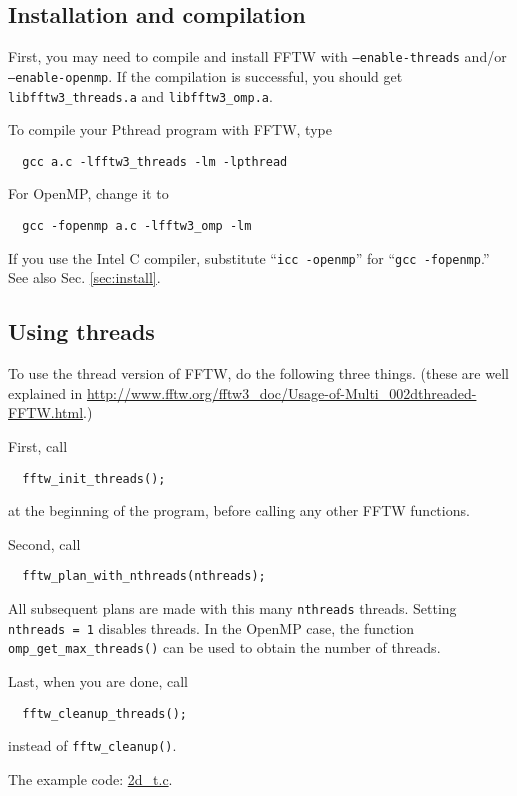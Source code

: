 \documentclass[12pt]{article}
\begin{document}
\subsection{Installation and compilation}

First, you may need to compile and install FFTW
  with \texttt{--enable-threads} and/or \texttt{--enable-openmp}.
If the compilation is successful,
  you should get \texttt{libfftw3\_threads.a}
  and \texttt{libfftw3\_omp.a}.



To compile your Pthread program with FFTW, type
\begin{verbatim}
  gcc a.c -lfftw3_threads -lm -lpthread
\end{verbatim}
%
For OpenMP, change it to
\begin{verbatim}
  gcc -fopenmp a.c -lfftw3_omp -lm
\end{verbatim}
If you use the Intel C compiler,
  substitute ``\texttt{icc -openmp}''
  for ``\texttt{gcc -fopenmp}.''
See also Sec. \ref{sec:install}.




\subsection{Using threads}

To use the thread version of FFTW, do the following three things.
(these are well explained in
\url{http://www.fftw.org/fftw3_doc/Usage-of-Multi_002dthreaded-FFTW.html}.)


First, call
\begin{verbatim}
  fftw_init_threads();
\end{verbatim}
at the beginning of the program, before calling any other FFTW functions.

Second, call
\begin{verbatim}
  fftw_plan_with_nthreads(nthreads);
\end{verbatim}
%
All subsequent plans are made with this many \texttt{nthreads} threads.
Setting \texttt{nthreads = 1} disables threads.
In the OpenMP case, the function \texttt{omp\_get\_max\_threads()}
can be used to obtain the number of threads.

Last, when you are done, call
\begin{verbatim}
  fftw_cleanup_threads();
\end{verbatim}
instead of \texttt{fftw\_cleanup()}.

The example code: \url{2d_t.c}.
\end{document}
